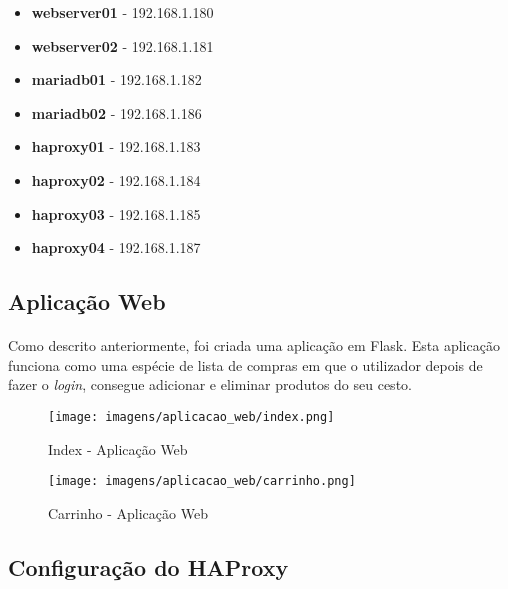 \documentclass{report}
\begin{document}
\begin{itemize}
  \item \textbf{webserver01} - 192.168.1.180
  \item \textbf{webserver02} - 192.168.1.181

  \item \textbf{mariadb01} - 192.168.1.182
  \item \textbf{mariadb02} - 192.168.1.186
    
  \item \textbf{haproxy01} - 192.168.1.183
  \item \textbf{haproxy02} - 192.168.1.184
    
  \item \textbf{haproxy03} - 192.168.1.185
  \item \textbf{haproxy04} - 192.168.1.187
\end{itemize}

\subsection{Aplicação Web}
\paragraph{}
Como descrito anteriormente, foi criada uma aplicação em Flask. Esta aplicação funciona como uma espécie de lista de compras em que o utilizador depois de fazer o \emph{login}, consegue adicionar e eliminar produtos do seu cesto.

\begin{figure}[H]
\center
\texttt{[image: imagens/aplicacao\_web/index.png]}
\caption{Index - Aplicação Web} 
\label{fig.nav}
\end{figure}


\begin{figure}[H]
\center
\texttt{[image: imagens/aplicacao\_web/carrinho.png]}
\caption{Carrinho - Aplicação Web}
\label{fig.nav}
\end{figure}

\subsection{Configuração do HAProxy}
\end{document}
